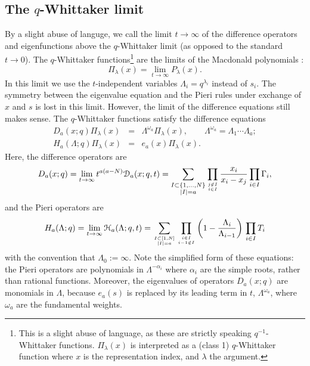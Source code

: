\documentclass[12pt]{amsart}
\newcommand{\D}{{\mathcal{D}}}
\newcommand{\cH}{{\mathcal{H}}}
\newcommand{\lL}{{\Lambda}}
\numberwithin{equation}{section}
\begin{document}
\subsection{The $q$-Whittaker limit}\label{sec:23}
By a slight abuse of languge, we call the limit $t\to\infty$ of the difference operators and eigenfunctions above the $q$-Whittaker limit (as opposed to the standard $t\to0$).
The $q$-Whittaker functions\footnote{This is a slight abuse of  language, as these are strictly speaking $q^{-1}$-Whittaker functions. $\Pi_\lambda(x)$ is interpreted as a (class 1) $q$-Whittaker function where $x$ is the representation index, and $\lambda$ the argument.} are the limits of the Macdonald polynomials \cite{cherednikqwhittaker}:
$$\Pi_\lambda(x) =  \lim_{t\to\infty} P_\lambda(x).$$
In this limit we use the $t$-independent variables $\Lambda_i=q^{\lambda_i}$ instead of $s_i$. The symmetry between the eigenvalue equation and the Pieri rules under exchange of $x$ and $s$ is lost in this limit. However, the limit of the difference equations still makes sense.
The $q$-Whittaker functions satisfy the difference equations
\begin{eqnarray}\label{DWhittaker}
D_a(x;q) \Pi_\lambda(x) &=& \Lambda^{\omega_a} \Pi_\lambda(x), \qquad \Lambda^{\omega_a} = \Lambda_1 \cdots \Lambda_a;
\label{eigenvalueW}\\
H_a(\Lambda;q) \Pi_\lambda(x) &=& e_a(x) \Pi_\lambda(x).\label{pieriW}
\end{eqnarray}
Here, the difference operators are
\begin{equation}\label{qDiffOp}
D_{a}(x;q) =\lim_{t\to\infty} t^{a(a-N)} \D_{a}(x;q,t) 
=
 \sum_{\substack{ I\subset\{1,...,N\}\\ |I|=a}} 
 \prod_{j\notin I\atop i\in I}
\frac{x_i}{x_i-x_j} \prod_{i\in I} \Gamma_i,%
\end{equation}
and the Pieri operators are
%
%
\begin{equation}\label{typeAHamiltonian}
H_a(\lL;q)=\lim_{t\to\infty} \cH_{a}(\lL;q,t)=\sum_{I\subset[1,N]\atop |I|=a}
\prod_{i\in I\atop i-1\notin I} \left(1-\frac{\Lambda_i}{\Lambda_{i-1}}\right) \, \prod_{i\in I}T_{i}
\end{equation}
with the convention that $\Lambda_0:=\infty$. Note the simplified form of these equations: 
the Pieri operators are polynomials in $\Lambda^{-\alpha_i}$ where $\alpha_i$ are the simple roots, rather than rational functions. Moreover,
the eigenvalues of operators $D_a(x;q)$ are monomials in $\Lambda$, because $e_a(s)$ is replaced by its leading term in $t$, $\Lambda^{\omega_a}$, where $\omega_a$ are the fundamental weights.
\end{document}
